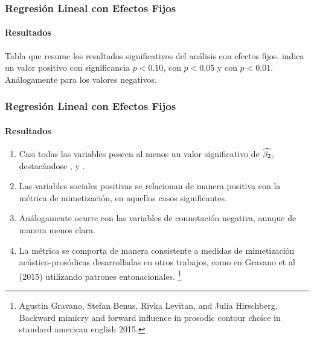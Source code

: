 \begin{frame}
\frametitle{Regresión Lineal con Efectos Fijos}
\framesubtitle{Resultados}

\begin{table}
  
\end{table}

Tabla que resume los resultados significativos del análisis con efectos fijos. \psl indica un valor positivo con significancia $p < 0.10$,  \ppsl con $p < 0.05$  y \pppsl con $p < 0.01$. Análogamente para los valores negativos.

\end{frame}


\begin{frame}
\frametitle{Regresión Lineal con Efectos Fijos}
\framesubtitle{Resultados}
\begin{enumerate}
  \item Casi todas las variables \ap poseen al menos un valor significativo de $\widehat{\beta_2}$, destacándose \ENGMEAN, \NOISETOHARMONICS y \FOMEAN.
  \item Las variables sociales positivas se relacionan de manera positiva con la métrica de mimetización, en aquellos casos significantes.
  \item Análogamente ocurre con las variables de connotación negativa, aunque de manera menos clara.
  \item La métrica se comporta de manera consistente a medidas de mimetización acústico-prosódicas desarrolladas en otros trabajos, como en Gravano et al (2015) utilizando patrones entonacionales. \footnote{Agustin Gravano, Stefan Benus, Rivka Levitan, and Julia Hirschberg. Backward mimicry and forward influence in prosodic contour choice in standard american english 2015.}
\end{enumerate}
\end{frame}
